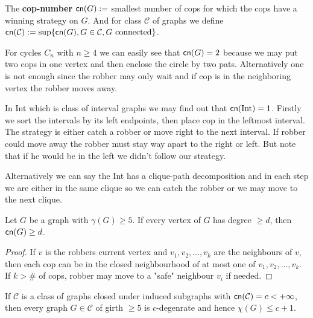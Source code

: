 \begin{defn}
	The \textbf{cop-number} $\operatorname{\textsf{cn}}(G) :=$ smallest number of cops for which the cops have a winning strategy on $G$. And for class $\mathcal{C}$ of graphs we define $\operatorname{\textsf{cn}}(\mathcal{C}) := \sup \{\operatorname{\textsf{cn}} (G), G \in \mathcal{C}, G \text{ connected}\}$.
\end{defn}

\begin{example}[Cycles]
	For cycles $C_n$ with $n \geq 4$ we can easily see that $\operatorname{\textsf{cn}}(G) = 2$ because we may put two cops in one vertex and then enclose the circle by two pats. Alternatively one is not enough since the robber may only wait and if cop is in the neighboring vertex the robber moves away.
\end{example}

\begin{example}[Int]
	In Int which is class of interval graphs we may find out that $\operatorname{\textsf{cn}}(\text{Int}) = 1$. Firstly we sort the intervals by its left endpoints, then place cop in the leftmost interval. The strategy is either catch a robber or move right to the next interval. If robber could move away the robber must stay way apart to the right or left. But note that if he would be in the left we didn't follow our strategy.
	
	Alternatively we can say the Int has a clique-path decomposition and in each step we are either in the same clique so we can catch the robber or we may move to the next clique.
\end{example}

\begin{prop}
	Let $G$ be a graph with $\gamma(G) \geq 5$. If every vertex of $G$ has degree $\geq d$, then $\operatorname{\textsf{cn}}(G) \geq d$.
	\label{girth-cop}
\end{prop}

\begin{proof}
	If $v$ is the robbers current vertex and $v_1, v_2, \dots, v_k$ are the neighbours of $v$, then each cop can be in the closed neighbourhood of at most one of $v_1, v_2, \dots, v_k$. If $k > \#$ of cops, robber may move to a "safe" neighbour $v_i$ if needed.
\end{proof}

\begin{cons}
	If $\mathcal{C}$ is a class of graphs closed under induced subgraphs with $\operatorname{\textsf{cn}}(\mathcal{C}) = c < + \infty$, then every graph $G \in \mathcal{C}$ of girth $\geq 5$ is $c$-degenrate and hence $\chi(G) \leq c+1$.
\end{cons}

